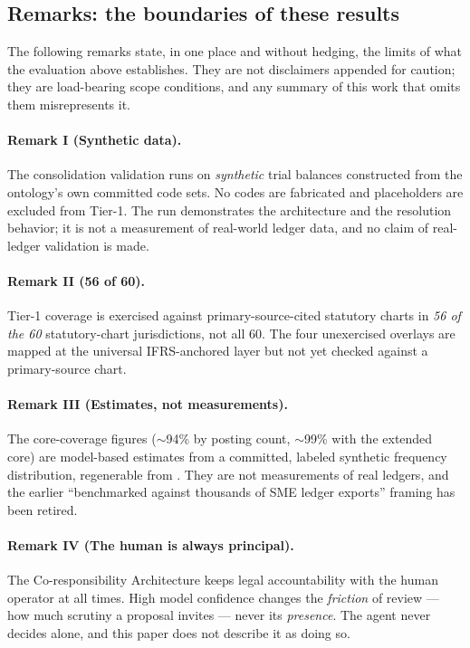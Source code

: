 \subsection{Remarks: the boundaries of these results}
\label{sec:remarks}

The following remarks state, in one place and without hedging, the limits of what
the evaluation above establishes. They are not disclaimers appended for caution;
they are load-bearing scope conditions, and any summary of this work that omits
them misrepresents it.

\paragraph{Remark I (Synthetic data).} The consolidation validation runs on
\emph{synthetic} trial balances constructed from the ontology's own committed code
sets. No codes are fabricated and placeholders are excluded from Tier-1. The run
demonstrates the architecture and the resolution behavior; it is not a
measurement of real-world ledger data, and no claim of real-ledger validation is
made.

\paragraph{Remark II (56 of 60).} Tier-1 coverage is exercised against
primary-source-cited statutory charts in \emph{56 of the 60} statutory-chart
jurisdictions, not all 60. The four unexercised overlays are mapped at the
universal IFRS-anchored layer but not yet checked against a primary-source chart.

\paragraph{Remark III (Estimates, not measurements).} The core-coverage figures
($\sim$94\% by posting count, $\sim$99\% with the extended core) are model-based
estimates from a committed, labeled synthetic frequency distribution, regenerable
from . They are not measurements of real
ledgers, and the earlier ``benchmarked against thousands of SME ledger exports''
framing has been retired.

\paragraph{Remark IV (The human is always principal).} The Co-responsibility
Architecture keeps legal accountability with the human operator at all times. High
model confidence changes the \emph{friction} of review --- how much scrutiny a
proposal invites --- never its \emph{presence}. The agent never decides alone, and
this paper does not describe it as doing so.

